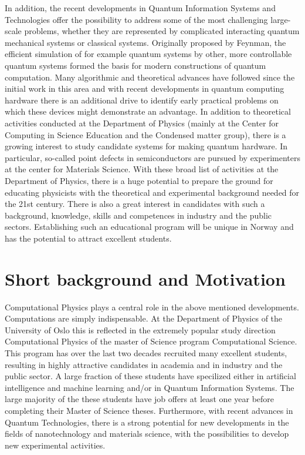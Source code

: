 \documentclass[aps,rmp,preprint,amsmath,amssymb,graphicx,longbibliography]{revtex4-1}
\begin{document}
In addition, the recent developments in Quantum Information Systems and Technologies offer the possibility to address some of the most challenging large-scale problems, whether they are represented by complicated interacting quantum mechanical systems or classical systems.
Originally proposed by Feynman, the efficient
simulation of for example quantum systems by other, more controllable quantum
systems formed the basis for modern constructions of quantum
computation.  
Many algorithmic and theoretical advances have followed since the
initial work in this area and with recent developments in quantum computing
hardware there is an additional drive to identify early practical problems on
which these devices might demonstrate an advantage. In addition to theoretical activities conducted at the Department of Physics (mainly at the Center for Computing in Science Education and the Condensed matter group), there is a growing interest to study candidate systems for making quantum hardware. In particular, so-called point defects in semiconductors are pursued by experimenters at the center for Materials Science. 
With these broad list of activities at the Department of Physics, there is a huge potential to prepare the ground for educating physicists with the theoretical and experimental background needed for the 21st century. There is also a great interest in candidates with such a background, knowledge, skills and competences in industry and the public sectors.
Establishing such an educational program will be unique in Norway and has the potential to attract excellent students.  



\section{Short background and Motivation}

Computational Physics plays a central role in the above mentioned   developments. 
Computations are simply indispensable. 
At the Department of Physics of the University of Oslo this is reflected in the extremely popular study direction Computational Physics of the master of Science program Computational Science. This program has over the last two decades recruited many excellent students, resulting in highly attractive candidates in academia and in industry  and the public sector. A large fraction of these students have specilized either in artificial intelligence and machine learning and/or in Quantum Information Systems.  The large  majority of the these students have job offers at least one year before completing their Master of Science theses. Furthermore, with recent advances in Quantum Technologies, there is a strong potential for new developments in the fields of nanotechnology and materials science, with the possibilities to develop new experimental activities. 
\end{document}

